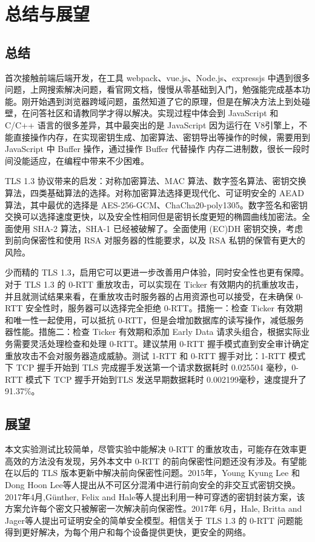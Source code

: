 \section{总结与展望}

\subsection{总结}

  首次接触前端后端开发，在工具 webpack、vue.js、Node.js、expressjs 中遇到很多问题，上网搜索解决问题，看官网文档，慢慢从零基础到入门，勉强能完成基本功能。刚开始遇到浏览器跨域问题，虽然知道了它的原理，但是在解决方法上到处碰壁，在问答社区和请教同学才得以解决。实现过程中体会到 JavaScript 和 C/C++ 语言的很多差异，其中最突出的是 JavaScript 因为运行在 V8引擎上，不能直接操作内存，在实现密钥生成、加密算法、密钥导出等操作的时候，需要用到 JavaScript 中 Buffer 操作，通过操作 Buffer 代替操作 内存二进制数，很长一段时间没能适应，在编程中带来不少困难。

  TLS 1.3 协议带来的启发：对称加密算法、MAC 算法、数字签名算法、密钥交换算法，四类基础算法的选择。对称加密算法选择更现代化、可证明安全的 AEAD 算法，其中最优的选择是 AES-256-GCM、ChaCha20-poly1305。数字签名和密钥交换可以选择速度更快，以及安全性相同但是密钥长度更短的椭圆曲线加密法。全面使用 SHA-2 算法，SHA-1 已经被破解了。全面使用 (EC)DH 密钥交换，考虑到前向保密性和使用 RSA 对服务器的性能要求，以及 RSA 私钥的保管有更大的风险。

  少而精的 TLS 1.3，启用它可以更进一步改善用户体验，同时安全性也更有保障。对于 TLS 1.3 的 0-RTT 重放攻击，可以实现在 Ticker 有效期内的抗重放攻击，并且就测试结果来看，在重放攻击时服务器的占用资源也可以接受，在未确保 0-RTT 安全性时，服务器可以选择完全拒绝 0-RTT。措施一：检查 Ticker 有效期和唯一性一起使用，可以抵抗 0-RTT，但是会增加数据库的读写操作，减低服务器性能。措施二：检查 Ticker 有效期和添加 Early Data 请求头组合，根据实际业务需要灵活处理检查和处理 0-RTT。建议禁用 0-RTT 握手模式直到安全审计确定重放攻击不会对服务器造成威胁。测试 1-RTT 和 0-RTT 握手对比：1-RTT 模式下 TCP 握手开始到 TLS 完成握手发送第一个请求数据耗时 0.025504 毫秒，0-RTT 模式下 TCP 握手开始到TLS 发送早期数据耗时 0.002199毫秒，速度提升了 91.37\%。

\subsection{展望}

  本文实验测试比较简单，尽管实验中能解决 0-RTT 的重放攻击，可能存在效率更高效的方法没有发现，另外本文中 0-RTT 的前向保密性问题还没有涉及。有望能在以后的 TLS 版本更新中解决前向保密性问题。2015年，Young Kyung Lee 和 Dong Hoon Lee\cite{7292984}等人提出从不可区分混淆中进行前向安全的非交互式密钥交换。2017年4月,Günther, Felix and Hale\cite{inproceedings1}等人提出利用一种可穿透的密钥封装方案，该方案允许每个密文只被解密一次解决前向保密性。2017年 6月，Hale, Britta and Jager\cite{inproceedings0}等人提出可证明安全的简单安全模型。相信关于 TLS 1.3 的 0-RTT 问题能得到更好解决，为每个用户和每个设备提供更快，更安全的网络。

\newpage